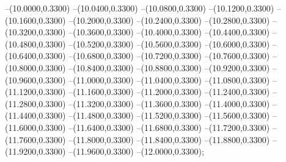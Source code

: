 {	--(10.0000,0.3300)
	--(10.0400,0.3300)
	--(10.0800,0.3300)
	--(10.1200,0.3300)
	--(10.1600,0.3300)
	--(10.2000,0.3300)
	--(10.2400,0.3300)
	--(10.2800,0.3300)
	--(10.3200,0.3300)
	--(10.3600,0.3300)
	--(10.4000,0.3300)
	--(10.4400,0.3300)
	--(10.4800,0.3300)
	--(10.5200,0.3300)
	--(10.5600,0.3300)
	--(10.6000,0.3300)
	--(10.6400,0.3300)
	--(10.6800,0.3300)
	--(10.7200,0.3300)
	--(10.7600,0.3300)
	--(10.8000,0.3300)
	--(10.8400,0.3300)
	--(10.8800,0.3300)
	--(10.9200,0.3300)
	--(10.9600,0.3300)
	--(11.0000,0.3300)
	--(11.0400,0.3300)
	--(11.0800,0.3300)
	--(11.1200,0.3300)
	--(11.1600,0.3300)
	--(11.2000,0.3300)
	--(11.2400,0.3300)
	--(11.2800,0.3300)
	--(11.3200,0.3300)
	--(11.3600,0.3300)
	--(11.4000,0.3300)
	--(11.4400,0.3300)
	--(11.4800,0.3300)
	--(11.5200,0.3300)
	--(11.5600,0.3300)
	--(11.6000,0.3300)
	--(11.6400,0.3300)
	--(11.6800,0.3300)
	--(11.7200,0.3300)
	--(11.7600,0.3300)
	--(11.8000,0.3300)
	--(11.8400,0.3300)
	--(11.8800,0.3300)
	--(11.9200,0.3300)
	--(11.9600,0.3300)
	--(12.0000,0.3300);
}
